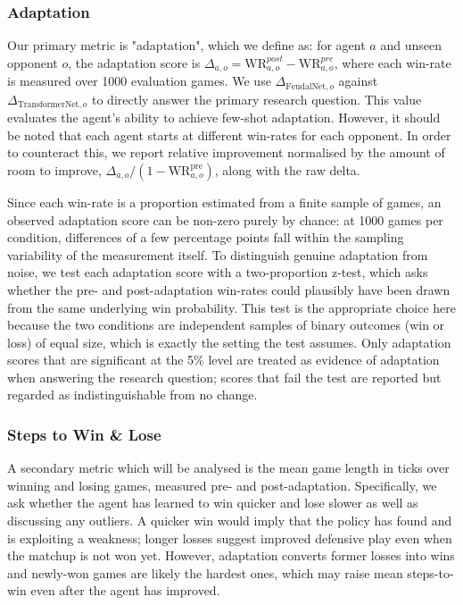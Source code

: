 \documentclass[sigconf,review=false]{acmart}
\begin{document}
\subsubsection{Adaptation}

Our primary metric is "adaptation", which we define as: for agent $a$ and unseen opponent $o$, the adaptation score is $\Delta_{a,o} = \text{WR}^{post}_{a,o} - \text{WR}^{pre}_{a,o}$, where each win-rate is measured over 1000 evaluation games.
We use $\Delta_{\text{FeudalNet}, o}$ against $\Delta_{\text{TransformerNet}, o}$ to directly answer the primary research question.
This value evaluates the agent's ability to achieve few-shot adaptation.
However, it should be noted that each agent starts at different win-rates for each opponent.
In order to counteract this, we report relative improvement normalised by the amount of room to improve, $\Delta_{a,o}/(1-\text{WR}_{a,o}^{\text{pre}})$, along with the raw delta.

Since each win-rate is a proportion estimated from a finite sample of games, an observed adaptation score can be non-zero purely by chance: at 1000 games per condition, differences of a few percentage points fall within the sampling variability of the measurement itself.
To distinguish genuine adaptation from noise, we test each adaptation score with a two-proportion z-test, which asks whether the pre- and post-adaptation win-rates could plausibly have been drawn from the same underlying win probability. 
This test is the appropriate choice here because the two conditions are independent samples of binary outcomes (win or loss) of equal size, which is exactly the setting the test assumes. 
Only adaptation scores that are significant at the 5\% level are treated as evidence of adaptation when answering the research question; scores that fail the test are reported but regarded as indistinguishable from no change.

\subsubsection{Steps to Win \& Lose}

A secondary metric which will be analysed is the mean game length in ticks over winning and losing games, measured pre- and post-adaptation.
Specifically, we ask whether the agent has learned to win quicker and lose slower as well as discussing any outliers.
A quicker win would imply that the policy has found and is exploiting a weakness; longer losses suggest improved defensive play even when the matchup is not won yet.
However, adaptation converts former losses into wins and newly-won games are likely the hardest ones, which may raise mean steps-to-win even after the agent has improved.
\end{document}
